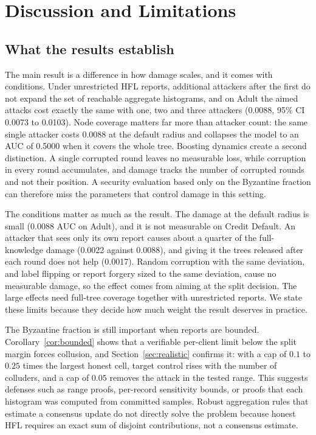 \documentclass[11pt]{article}
\newcommand{\rev}[1]{{\color{blue}#1}}
\begin{document}
\FloatBarrier

\section{Discussion and Limitations}
\label{sec:discussion}

\subsection{What the results establish}

\rev{The main result is a difference in how damage scales, and it comes with conditions. Under unrestricted HFL reports, additional attackers after the first do not expand the set of reachable aggregate histograms, and on Adult the aimed attacks cost exactly the same with one, two and three attackers (0.0088, 95\% CI 0.0073 to 0.0103). Node coverage matters far more than attacker count: the same single attacker costs 0.0088 at the default radius and collapses the model to an AUC of 0.5000 when it covers the whole tree. Boosting dynamics create a second distinction. A single corrupted round leaves no measurable loss, while corruption in every round accumulates, and damage tracks the number of corrupted rounds and not their position. A security evaluation based only on the Byzantine fraction can therefore miss the parameters that control damage in this setting.}

\rev{The conditions matter as much as the result. The damage at the default radius is small (0.0088 AUC on Adult), and it is not measurable on Credit Default. An attacker that sees only its own report causes about a quarter of the full-knowledge damage (0.0022 against 0.0088), and giving it the trees released after each round does not help (0.0017). Random corruption with the same deviation, and label flipping or report forgery sized to the same deviation, cause no measurable damage, so the effect comes from aiming at the split decision. The large effects need full-tree coverage together with unrestricted reports. We state these limits because they decide how much weight the result deserves in practice.}

The Byzantine fraction is still important when reports are bounded. Corollary~\ref{cor:bounded} shows that a verifiable per-client limit below the split margin forces collusion\rev{, and Section~\ref{sec:realistic} confirms it: with a cap of $0.1$ to $0.25$ times the largest honest cell, target control rises with the number of colluders, and a cap of $0.05$ removes the attack in the tested range}. This suggests defenses such as range proofs, per-record sensitivity bounds, or proofs that each histogram was computed from committed samples. Robust aggregation rules that estimate a consensus update do not directly solve the problem because honest HFL requires an exact sum of disjoint contributions, not a consensus estimate.
\end{document}
